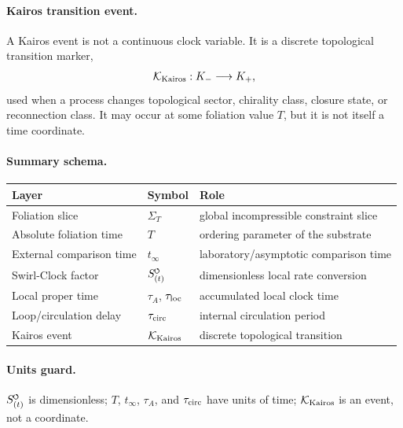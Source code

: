 \documentclass[11pt]{article}
\theoremstyle{definition}
\theoremstyle{plain}
\theoremstyle{remark}
\newcommand{\swirlarrow}{\mathchoice{\mkern-2mu\scriptstyle\boldsymbol{\circlearrowleft}}{\mkern-2mu\scriptstyle\boldsymbol{\circlearrowleft}}{\mkern-2mu\scriptscriptstyle\boldsymbol{\circlearrowleft}}{\mkern-2mu\scriptscriptstyle\boldsymbol{\circlearrowleft}}}
\newcommand{\SwirlClock}{{S_{(t)}^{\swirlarrow}}}
\begin{document}
        \paragraph{Kairos transition event.}
        A Kairos event is not a continuous clock variable.  It is a discrete
        topological transition marker,
        \begin{align}
            \mathcal{K}_{\rm Kairos}:
            K_-
            \longrightarrow
            K_+ ,
            \label{eq:canonical_time_ontology_kairos}
        \end{align}
        used when a process changes topological sector, chirality class, closure
        state, or reconnection class.  It may occur at some foliation value \(T\),
        but it is not itself a time coordinate.

        \paragraph{Summary schema.}
        \begin{center}
        \begin{tabular}{lll}
        \hline
        Layer & Symbol & Role \\
        \hline
        Foliation slice & \(\Sigma_T\) & global incompressible constraint slice \\
        Absolute foliation time & \(T\) & ordering parameter of the substrate \\
        External comparison time & \(t_{\infty}\) & laboratory/asymptotic comparison time \\
        Swirl-Clock factor & \(\SwirlClock\) & dimensionless local rate conversion \\
        Local proper time & \(\tau_A\), \(\tau_{\rm loc}\) & accumulated local clock time \\
        Loop/circulation delay & \(\tau_{\rm circ}\) & internal circulation period \\
        Kairos event & \(\mathcal{K}_{\rm Kairos}\) & discrete topological transition \\
        \hline
        \end{tabular}
        \end{center}

        \paragraph{Units guard.}
        \(\SwirlClock\) is dimensionless; \(T\), \(t_{\infty}\), \(\tau_A\), and
        \(\tau_{\rm circ}\) have units of time; \(\mathcal{K}_{\rm Kairos}\) is an
        event, not a coordinate.
\end{document}
